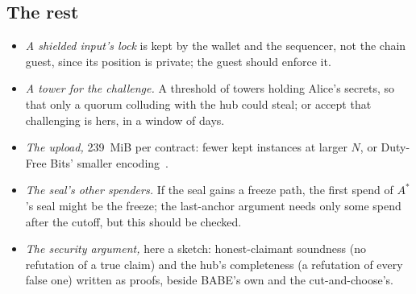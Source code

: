 \documentclass[11pt]{article}
\newcommand{\Astar}{A^{*}}
\begin{document}
\subsection{The rest}

\begin{itemize}[leftmargin=1.5em]
\item \emph{A shielded input's lock} is kept by the wallet and the
  sequencer, not the chain guest, since its position is private; the
  guest should enforce it.
\item \emph{A tower for the challenge.} A threshold of towers holding
  Alice's secrets, so that only a quorum colluding with the hub could
  steal; or accept that challenging is hers, in a window of days.
\item \emph{The upload,} 239~MiB per contract: fewer kept instances at
  larger $N$, or Duty-Free Bits' smaller encoding~\cite[App.~A]{lichen}.
\item \emph{The seal's other spenders.} If the seal gains a freeze path,
  the first spend of $\Astar$'s seal might be the freeze; the
  last-anchor argument needs only some spend after the cutoff, but this
  should be checked.
\item \emph{The security argument,} here a sketch: honest-claimant
  soundness (no refutation of a true claim) and the hub's completeness
  (a refutation of every false one) written as proofs, beside BABE's
  own and the cut-and-choose's.
\end{itemize}
\end{document}
